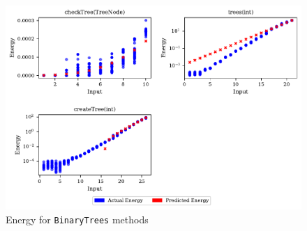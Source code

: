 \begin{figure}[htbp]
  \centering
  \includegraphics[width=\textwidth]{figures/binarytrees_energy_panel_plot.pdf}
  \caption{Energy for \texttt{BinaryTrees} methods}
  \label{fig:binarytrees_energy_panel_plot}
\end{figure}

